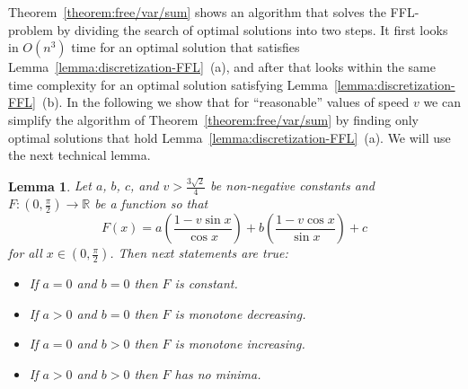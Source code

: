 \documentclass[11pt,a4paper,oneside,onecolumn]{article}
\newtheorem{lemma}[theorem]{Lemma}
\begin{document}
 Theorem~\ref{theorem:free/var/sum} shows an algorithm
that solves the FFL-problem by dividing the search of optimal
solutions into two steps. It first looks in $O(n^3)$ time for an
optimal solution that satisfies
Lemma~\ref{lemma:discretization-FFL}~(a), and after that looks
within the same time complexity for an optimal solution satisfying
Lemma~\ref{lemma:discretization-FFL}~(b). In the following we show
that for ``reasonable'' values of speed $v$ we can simplify the
algorithm of Theorem~\ref{theorem:free/var/sum} by finding only
optimal solutions that hold
Lemma~\ref{lemma:discretization-FFL}~(a). We will use the next
technical lemma.
\begin{lemma}\label{lemma:function}
Let $a$, $b$, $c$, and $v>\frac{3\sqrt{2}}{4}$ be non-negative
constants and $F:(0,\frac{\pi}{2})\rightarrow\mathbb{R}$ be a
function so that
$$F(x)=a\left(\frac{1-v\sin x}{\cos x}\right)+b\left(\frac{1-v\cos x}{\sin x}\right)+c$$
for all $x\in(0,\frac{\pi}{2})$. Then next statements are true:
\begin{itemize}
  \item[$($a$)$] If $a=0$ and $b=0$ then $F$ is constant.
  \item[$($b$)$] If $a>0$ and $b=0$ then $F$ is monotone decreasing.
  \item[$($c$)$] If $a=0$ and $b>0$ then $F$ is monotone increasing.
  \item[$($d$)$] If $a>0$ and $b>0$ then $F$ has no minima.
\end{itemize}
\end{lemma}
\end{document}
